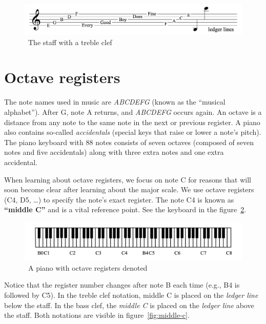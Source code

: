 \begin{figure}
    \centering
    \includegraphics[width=\textwidth]{assets/staff}
    \caption{~The staff with a treble clef~\cite{music-theory}}\label{fig:staff}
\end{figure}


\section{Octave registers}\label{sec:octave-registers}

The note names used in music are \textit{ABCDEFG} (known as the ``musical alphabet'').
After G, note A returns, and \textit{ABCDEFG} occurs again.
An octave is a distance from any note to the same note in the next or previous register.
A piano also contains so-called \textit{accidentals} (special keys that raise or lower a note's pitch).
The piano keyboard with 88 notes consists of seven octaves (composed of seven notes and five accidentals) along with three extra notes and one extra accidental.~\cite{music-theory}

When learning about octave registers, we focus on note C for reasons that will soon become clear after learning about the major scale.
We use octave registers (C4, D5, \ldots) to specify the note's exact register.
The note C4 is known as \textbf{``middle C''} and is a vital reference point.
See the keyboard in the figure~\ref{fig:octave-registers}.~\cite{music-theory}

\begin{figure}
    \centering
    \includegraphics[width=\textwidth]{assets/octave-registers}
    \caption{~A piano with octave registers denoted~\cite{music-theory}}\label{fig:octave-registers}
\end{figure}

Notice that the register number changes after note B each time (e.g., B4 is followed by C5).
In the treble clef notation, middle C is placed on the \textit{ledger line} below the staff.
In the bass clef, the \textit{middle C} is placed on the \textit{ledger line} above the staff.
Both notations are visible in figure~\ref{fig:middle-c}.~\cite{music-theory}

